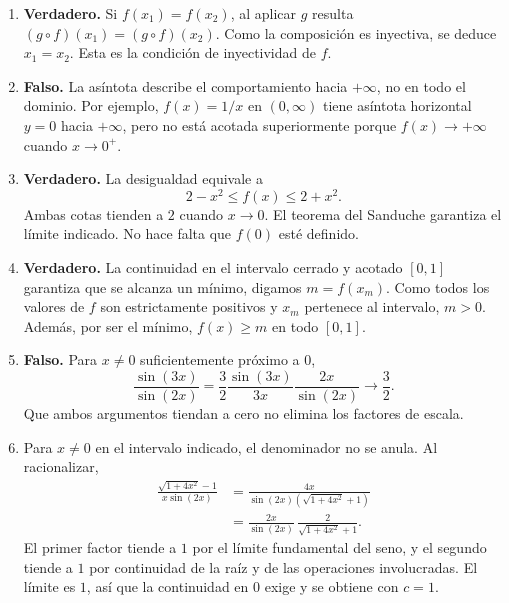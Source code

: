 \documentclass[10pt,a5paper]{article}
\newif\ifmostrarSoluciones
\begin{document}
\ifmostrarSoluciones
\newpage
\begin{solucion}
\begin{enumerate}
  \item \textbf{Verdadero.} Si $f(x_1)=f(x_2)$, al aplicar $g$ resulta $(g\circ f)(x_1)=(g\circ f)(x_2)$. Como la composición es inyectiva, se deduce $x_1=x_2$. Esta es la condición de inyectividad de $f$.
  \item \textbf{Falso.} La asíntota describe el comportamiento hacia $+\infty$, no en todo el dominio. Por ejemplo, $f(x)=1/x$ en $(0,\infty)$ tiene asíntota horizontal $y=0$ hacia $+\infty$, pero no está acotada superiormente porque $f(x)\to+\infty$ cuando $x\to0^+$.
  \item \textbf{Verdadero.} La desigualdad equivale a
  \[
    2-x^2\leq f(x)\leq2+x^2.
  \]
  Ambas cotas tienden a $2$ cuando $x\to0$. El teorema del Sanduche garantiza el límite indicado. No hace falta que $f(0)$ esté definido.
  \item \textbf{Verdadero.} La continuidad en el intervalo cerrado y acotado $[0,1]$ garantiza que se alcanza un mínimo, digamos $m=f(x_m)$. Como todos los valores de $f$ son estrictamente positivos y $x_m$ pertenece al intervalo, $m>0$. Además, por ser el mínimo, $f(x)\geq m$ en todo $[0,1]$.
  \item \textbf{Falso.} Para $x\neq0$ suficientemente próximo a $0$,
  \[
    \frac{\sin(3x)}{\sin(2x)}
    =\frac32\frac{\sin(3x)}{3x}\frac{2x}{\sin(2x)}
    \longrightarrow\frac32.
  \]
  Que ambos argumentos tiendan a cero no elimina los factores de escala.

  \item Para $x\neq0$ en el intervalo indicado, el denominador no se anula. Al racionalizar,
  \begin{align*}
    \frac{\sqrt{1+4x^2}-1}{x\sin(2x)}
    &=\frac{4x}{\sin(2x)(\sqrt{1+4x^2}+1)}\\
    &=\frac{2x}{\sin(2x)}\,
      \frac{2}{\sqrt{1+4x^2}+1}.
  \end{align*}
  El primer factor tiende a $1$ por el límite fundamental del seno, y el segundo tiende a $1$ por continuidad de la raíz y de las operaciones involucradas. El límite es $1$, así que la continuidad en $0$ exige y se obtiene con $c=1$.


\end{enumerate}
\end{solucion}
\end{document}
